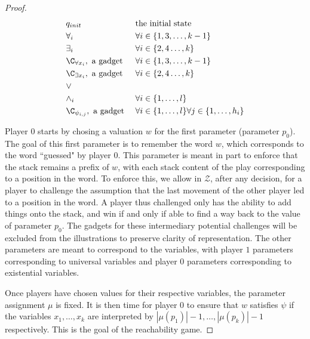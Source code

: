 \begin{proof}
\begin{align*}
	&q_{init} &  & \text{the initial state} \\
	& \forall_i &	& \forall i \in \{1, 3, \ldots, k-1\}\\
	& \exists_i &	& \forall i \in \{2, 4 \ldots, k\}\\
	& \C_{\forall x_i},\text{ a gadget } & &\forall i \in \{1, 3, \ldots, k-1\}\\	
	& \C_{\exists x_i},\text{ a gadget } & &\forall i \in \{2, 4 \ldots, k\}\\	
	& \vee & & \\
	& \wedge_i & & \forall i \in \{ 1, \ldots, l\} \\
	& \C_{\psi_{i,j}},  \text{ a gadget }&  & \forall i \in \{ 1, \ldots, l\}  \forall j \in \{ 1, \ldots, h_i\} \\
\end{align*}


Player $0$ starts by chosing a valuation $w$ for the first parameter (parameter $p_0$). The goal of this first parameter is to remember
the word $w$, which corresponds to the word ``guessed" by player $0$. 
This parameter is meant in part to enforce that 
the stack remains a prefix of $w$, with each stack content of the play corresponding to a position in the word.
 To enforce this, we allow in $\mathcal{Z}$, after any decision, for a player to challenge the assumption that the last movement of the other player led to a position in the word.
  A player thus challenged only has the ability to add things onto the stack, and win if and only if able to find a way back to the value of parameter $p_0$. 
 The gadgets for these intermediary potential challenges will be excluded from the illustrations to preserve clarity of representation.
The other parameters are meant to correspond to the variables, with player $1$ parameters corresponding to universal variables and player $0$ parameters corresponding to existential variables.

Once players have chosen values for their respective variables, the parameter assignment
$\mu$ is fixed. It is then time
for player $0$ to ensure that
$w$
satisfies $\psi$ if the variables $x_1, \ldots, x_k$ are interpreted by 
$ |\mu(p_1)|-1, \ldots, |\mu(p_k)|-1$ respectively. This is the goal of the reachability game.





\end{proof}
